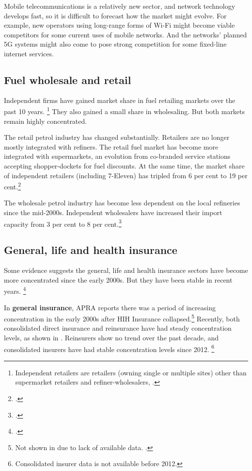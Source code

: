Mobile telecommunications is a relatively new sector, and network technology develops fast, so it is difficult to forecast how the market might evolve. For example, new operators using long-range forms of Wi-Fi might become viable competitors for some current uses of mobile networks. And the networks' planned 5G systems might also come to pose strong competition for some fixed-line internet services.

\subsection{Fuel wholesale and retail}

Independent firms have gained market share in fuel retailing markets over the past 10 years.%
\footnote{Independent retailers are retailers (owning single or multiple sites) other than supermarket retailers and refiner-wholesalers, \textcite{ACCC_Petrol_2014}.} They also gained a small share in wholesaling. But both markets remain highly concentrated.%

The retail petrol industry has changed substantially. Retailers are no longer mostly integrated with refiners. The retail fuel market has become more integrated with supermarkets, an evolution from co-branded service stations accepting shopper-dockets for fuel discounts. At the same time, the market share of independent retailers (including 7-Eleven) has tripled from 6 per cent to 19 per cent.\footcite{ACCC_Petrol_2014}

The wholesale petrol industry has become less dependent on the local refineries since the mid-2000s. Independent wholesalers have increased their import capacity from 3 per cent to 8 per cent.\footcite{ACCC_Petrol_2014}

\subsection{General, life and health insurance}

Some evidence suggests the general, life and health insurance sectors have become more concentrated since the early 2000s. But they have been stable in recent years.%
\footcites{APRA_insurance_2017}{APRA_FSI_2014}

In \textbf{general insurance},  APRA reports there was a period of increasing concentration in the early 2000s after HIH Insurance collapsed.\footnote{Not shown in  due to lack of available data. \textcite{APRA_FSI_2014}.} Recently, both consolidated direct insurance and reinsurance have had steady concentration levels, as shown in . Reinsurers show no trend over the past decade, and consolidated insurers have had stable concentration levels since 2012.%
  \footnote{Consolidated insurer data is not available before 2012.}



